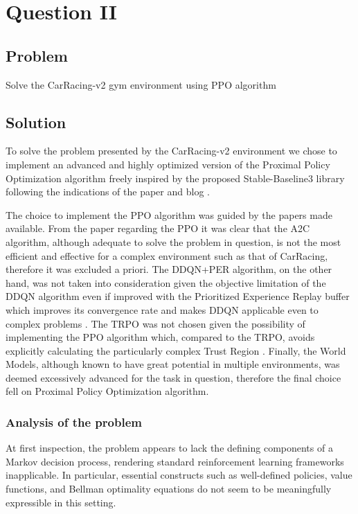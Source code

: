 \documentclass[main.tex]{subfiles}
\begin{document}
\section{Question II}\label{sec:question II}

\subsection{Problem}
Solve the CarRacing-v2 gym environment using PPO algorithm
\subsection{Solution}

To solve the problem presented by the CarRacing-v2 environment we chose to implement an advanced and highly optimized version of the Proximal Policy Optimization algorithm freely inspired by the proposed Stable-Baseline3 library following the indications of the paper \cite{huang2022a2cspecialcaseppo} and blog \cite{shengyi2022the37implementation}.

The choice to implement the PPO algorithm was guided by the papers made available. From the paper \cite{schulman2017proximalpolicyoptimizationalgorithms} regarding the PPO it was clear that the A2C algorithm, although adequate to solve the problem in question, is not the most efficient and effective for a complex environment such as that of CarRacing, therefore it was excluded a priori. The DDQN+PER algorithm, on the other hand, was not taken into consideration given the objective limitation of the DDQN algorithm even if improved with the Prioritized Experience Replay buffer which improves its convergence rate and makes DDQN applicable even to complex problems \cite{schaul2016prioritizedexperiencereplay}. The TRPO was not chosen given the possibility of implementing the PPO algorithm which, compared to the TRPO, avoids explicitly calculating the particularly complex Trust Region \cite{schulman2017proximalpolicyoptimizationalgorithms}. Finally, the World Models, although known to have great potential in multiple environments, \cite{https://doi.org/10.5281/zenodo.1207631} was deemed excessively advanced for the task in question, therefore the final choice fell on Proximal Policy Optimization algorithm.

\subsubsection{Analysis of the problem}
At first inspection, the problem appears to lack the defining components of a Markov decision process, rendering standard reinforcement learning frameworks inapplicable. In particular, essential constructs such as well-defined policies, value functions, and Bellman optimality equations do not seem to be meaningfully expressible in this setting. 
\end{document}
